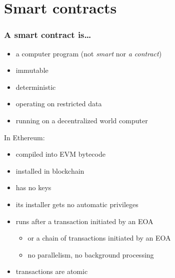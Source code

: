 \documentclass[11pt]{beamer}  %
\begin{document}
\section{Smart contracts}

\begin{frame}\frametitle{A smart contract is\ldots}

  \begin{itemize}
  \item a computer program (not \emph{smart} nor \emph{a contract})
  \item immutable
  \item deterministic
  \item operating on restricted data
  \item running on a decentralized world computer
  \end{itemize}

  In Ethereum:
  \begin{itemize}
  \item compiled into EVM bytecode
  \item installed in blockchain
  \item has no keys
  \item its installer gets no automatic privileges
  \item runs after a transaction initiated by an EOA
    \begin{itemize}
    \item or a chain of transactions initiated by an EOA
    \item no parallelism, no background processing
    \end{itemize}
  \item transactions are atomic
  \end{itemize}
  
\end{frame}
\end{document}
